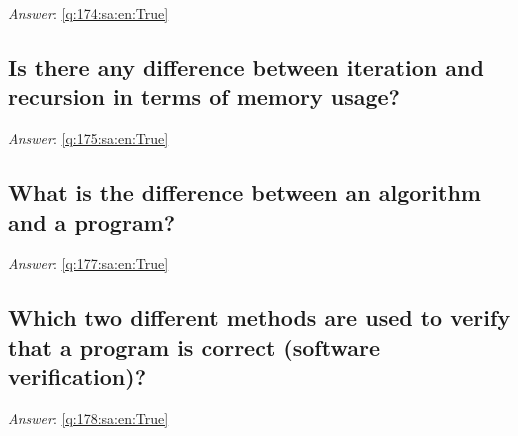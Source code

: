 \documentclass[a4paper,11pt,oneside]{article}
\begin{document}
\begin{sloppypar}
\vspace{2cm}

\noindent\makebox[\textwidth]{\hrulefill}

\vspace{1cm}

\textit{Answer}: \autoref{q:174:sa:en:True}



\subsection{Is there any difference between iteration and recursion in terms of memory usage?}

\label{q:175:sa:en:False}

\vspace{2cm}

\noindent\makebox[\textwidth]{\hrulefill}

\vspace{1cm}

\textit{Answer}: \autoref{q:175:sa:en:True}



\subsection{What is the difference between an algorithm and a program?}

\label{q:177:sa:en:False}

\vspace{2cm}

\noindent\makebox[\textwidth]{\hrulefill}

\vspace{1cm}

\textit{Answer}: \autoref{q:177:sa:en:True}



\subsection{Which two different methods are used to verify that a program is correct (software verification)?}

\label{q:178:sa:en:False}

\vspace{2cm}

\noindent\makebox[\textwidth]{\hrulefill}

\vspace{1cm}

\textit{Answer}: \autoref{q:178:sa:en:True}




\end{sloppypar}
\end{document}
